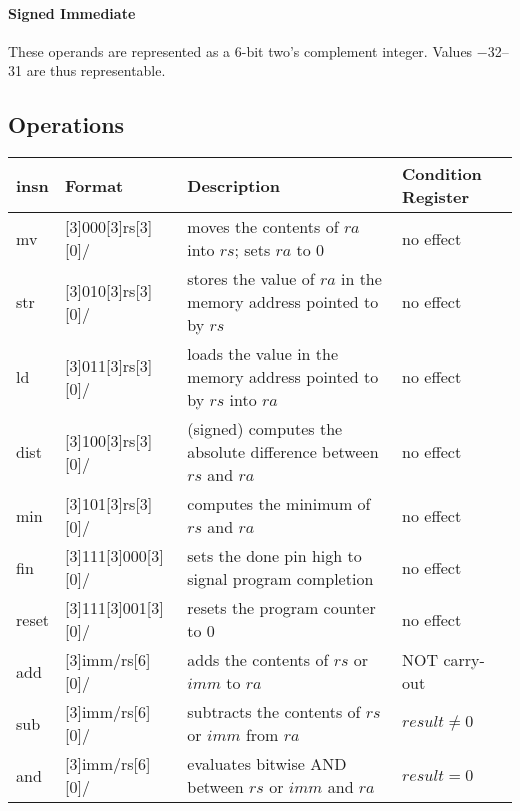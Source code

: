 \documentclass{article}
\begin{document}
    \paragraph{Signed Immediate}
    These operands are represented as a 6-bit two's complement integer. Values
    \numrange{-32}{31} are thus representable.

    \subsection{Operations}

    {\tabulinesep=1.2mm
    \begin{tabu}{ | l | l | p{4cm} | p{2.45cm} | }
        \hline
        insn & Format & Description & Condition Register \\ \hline
        mv & {\centering {}[3]{000}[3]{rs}[3]{}[0]/} & moves the contents of $ra$ into $rs$; sets $ra$ to 0 & no effect \\ \hline
        str & {\centering {}[3]{010}[3]{rs}[3]{}[0]/} & stores the value of $ra$ in the memory address pointed to by $rs$ &
        no effect \\ \hline
        ld & {\centering {}[3]{011}[3]{rs}[3]{}[0]/} & loads the value in the memory address pointed to by $rs$ into $ra$ &
        no effect \\ \hline
        dist & {\centering {}[3]{100}[3]{rs}[3]{}[0]/} & (signed) computes the absolute difference between $rs$ and $ra$ & no effect \\ \hline
        min & {\centering {}[3]{101}[3]{rs}[3]{}[0]/} & computes the minimum of $rs$ and $ra$ & no effect \\ \hline
        fin & {\centering {}[3]{111}[3]{000}[3]{}[0]/} & sets the done pin high to signal program completion & no effect \\ \hline
        reset & {\centering {}[3]{111}[3]{001}[3]{}[0]/} & resets the program counter to 0 & no effect \\ \hline
        add & {\centering {}[3]{imm/rs}[6]{}[0]/} & adds the contents of $rs$ or $imm$ to $ra$ & NOT carry-out \\ \hline
        sub & {\centering {}[3]{imm/rs}[6]{}[0]/} & subtracts the contents of $rs$ or $imm$ from $ra$ & $result \neq 0$ \\ \hline
        and & {\centering {}[3]{imm/rs}[6]{}[0]/} & evaluates bitwise AND between $rs$ or $imm$ and $ra$ & $result = 0$ \\ \hline

\end{tabu}}
\end{document}
